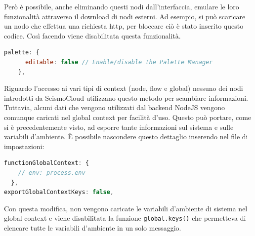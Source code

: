 \documentclass[a4paper,10pt]{memoir}
\begin{document}
Però è possibile, anche eliminando questi nodi dall'interfaccia, emulare le loro funzionalità attraverso il download di nodi esterni.
Ad esempio, si può scaricare un nodo che effettua una richiesta http, per bloccare ciò è stato inserito questo codice. Così facendo viene disabilitata questa funzionalità.
\begin{lstlisting}[language=Javascript, firstnumber=93]
    palette: {
      editable: false // Enable/disable the Palette Manager
    },
\end{lstlisting}

Riguardo l'accesso ai vari tipi di context (node, flow e global) nessuno dei nodi introdotti da SeismoCloud utilizzano questo metodo per scambiare informazioni.
Tuttavia, alcuni dati che vengono utilizzati dal backend NodeJS vengono comunque caricati nel global context per facilità d'uso. Questo può portare, come si è precedentemente visto, ad esporre tante informazioni sul sistema e sulle variabili d'ambiente.
È possibile nascondere questo dettaglio inserendo nel file di impostazioni:
\begin{lstlisting}[language=Javascript, firstnumber=56]
functionGlobalContext: {
    // env: process.env
  },
exportGlobalContextKeys: false,
\end{lstlisting}
Con questa modifica, non vengono caricate le variabili d'ambiente di sistema nel global context e viene disabilitata la funzione \texttt{global.keys()} che permetteva di elencare tutte le variabili d'ambiente in un solo messaggio.
\end{document}
